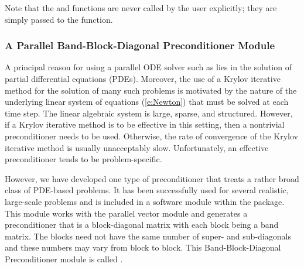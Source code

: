 Note that the  and  functions are never called 
by the user explicitly; they are simply passed to the  function.


\subsubsection{A Parallel Band-Block-Diagonal Preconditioner Module}\label{sss:cvbbdpre}

A principal reason for using a parallel ODE solver such as {\cvodes} lies
in the solution of partial differential equations (PDEs).  Moreover,
the use of a Krylov iterative method for the solution of many such
problems is motivated by the nature of the underlying linear system of
equations (\ref{e:Newton}) that must be solved at each time step.  The
linear algebraic system is large, sparse, and structured. However, if
a Krylov iterative method is to be effective in this setting, then a
nontrivial preconditioner needs to be used.  Otherwise, the rate of
convergence of the Krylov iterative method is usually unacceptably
slow.  Unfortunately, an effective preconditioner tends to be
problem-specific.

However, we have developed one type of preconditioner that treats a
rather broad class of PDE-based problems.  It has been successfully
used for several realistic, large-scale problems \cite{HT98} and is
included in a software module within the {\cvodes} package. This module
works with the parallel vector module {\nvecp} and 
generates a preconditioner that is a block-diagonal matrix with each
block being a band matrix. The blocks need not have the same number of
super- and sub-diagonals and these numbers may vary from block to
block. This Band-Block-Diagonal Preconditioner module is called
{\cvbbdpre}.

